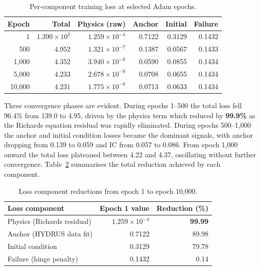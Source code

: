 \documentclass[12pt]{report}
\begin{document}
\begin{table}[htbp]
\centering
\begin{tabular}{rrrrrr}
\hline
\textbf{Epoch} & \textbf{Total} & \textbf{Physics (raw)} &
\textbf{Anchor} & \textbf{Initial} & \textbf{Failure} \\
\hline
1       & $1.390 \times 10^{2}$ & $1.259 \times 10^{-4}$ & 0.7122 & 0.3129 & 0.1432 \\
500     & $4.952$               & $1.321 \times 10^{-7}$ & 0.1387 & 0.0567 & 0.1433 \\
1,000   & $4.352$               & $3.940 \times 10^{-8}$ & 0.0590 & 0.0855 & 0.1434 \\
5,000   & $4.233$               & $2.678 \times 10^{-9}$ & 0.0708 & 0.0655 & 0.1434 \\
10,000  & $4.231$               & $1.775 \times 10^{-8}$ & 0.0713 & 0.0633 & 0.1434 \\
\hline
\end{tabular}
\caption{Per-component training loss at selected Adam epochs.}
\label{tab:training_loss}
\end{table}

Three convergence phases are evident. During epochs 1--500 the total
loss fell 96.4\% from 139.0 to 4.95, driven by the physics term which
reduced by \textbf{99.9\%} as the Richards equation residual was
rapidly eliminated. During epochs 500--1,000 the anchor and initial
condition losses became the dominant signals, with anchor dropping
from 0.139 to 0.059 and IC from 0.057 to 0.086. From epoch 1,000
onward the total loss plateaued between 4.22 and 4.37, oscillating
without further convergence. Table~\ref{tab:convergence_summary}
summarises the total reduction achieved by each component.

\begin{table}[htbp]
\centering
\begin{tabular}{lrr}
\hline
\textbf{Loss component} & \textbf{Epoch 1 value} &
\textbf{Reduction (\%)} \\
\hline
Physics (Richards residual) & $1.259 \times 10^{-4}$ & \textbf{99.99} \\
Anchor (HYDRUS data fit)    & 0.7122                  & 89.98 \\
Initial condition           & 0.3129                  & 79.78 \\
Failure (hinge penalty)     & 0.1432                  & 0.14 \\
\hline
\end{tabular}
\caption{Loss component reductions from epoch 1 to epoch 10,000.}
\label{tab:convergence_summary}
\end{table}
\end{document}
